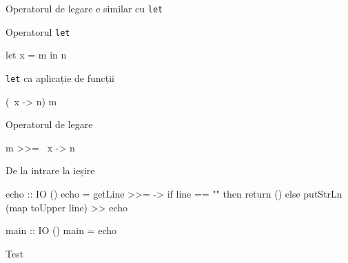 \documentclass[xcolor=pdftex,romanian,colorlinks]{beamer}
\begin{document}
\begin{frame}[fragile]{Operatorul de legare e similar cu \lstinline$let$}
\begin{block}
{Operatorul \lstinline$let$} 
\begin{asciihs}
    let x = m in n  
\end{asciihs}
\end{block}

\begin{block}
{\lstinline$let$ ca aplicație de funcții} 
\begin{asciihs}
    (\ x -> n) m
\end{asciihs}
\end{block}

\begin{block}
{Operatorul de legare} 
\begin{asciihs}
    m >>= \ x -> n 
\end{asciihs}
\end{block}

\end{frame}
%
%
%
\begin{frame}[fragile]{}
\begin{asciihs}
\end{asciihs}
\end{frame}
%
\begin{frame}[fragile]{De la intrare la ieșire}
\begin{asciihs}
   echo :: IO ()
   echo = getLine >>= \line ->
           if line == "" then
             return ()
           else
             putStrLn (map toUpper line) >>
             echo

   main :: IO ()
   main = echo
\end{asciihs}
\begin{block}{Test}
\end{block}

\end{frame}
%
\end{document}
